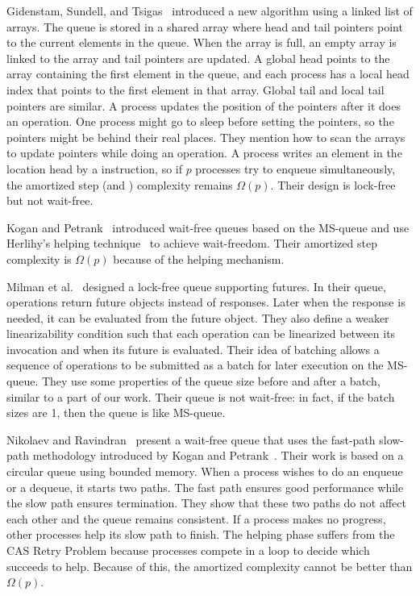 Gidenstam, Sundell, and Tsigas~\cite{DBLP:conf/opodis/GidenstamST10}
introduced a new algorithm using a linked list of arrays. The queue is
stored in a shared array where head and tail pointers point to the
current elements in the queue. When the array is full, an empty array
is linked to the array and tail pointers are updated. A global head
points to the array containing the first element in the queue, and
each process has a local head index that points to the first element
in that array. Global tail and local tail pointers are similar. A
process updates the position of the pointers after it does an
operation. One process might go to sleep before setting the pointers,
so the pointers might be behind their real places. They mention how to
scan the arrays to update pointers while doing an operation. A process
writes an element in the location head by a  instruction, so
if $p$ processes try to enqueue simultaneously, the amortized step
(and ) complexity remains $\Omega(p)$. Their design is
lock-free but not wait-free. 

Kogan and Petrank~\cite{DBLP:conf/ppopp/KoganP11} introduced wait-free
queues based on the MS-queue and use Herlihy's helping
technique~\cite{10.1145/114005.102808} to achieve wait-freedom. Their
amortized step complexity is $\Omega(p)$ because of the helping
mechanism. 

Milman et al.~\cite{DBLP:conf/spaa/MilmanKLLP18} designed a lock-free
queue supporting futures. In their queue, operations  return future
objects instead of responses. Later when the response is needed, it
can be evaluated from the future object. They also define a weaker
linearizability condition such that each operation can be linearized
between its invocation and when its future is evaluated. Their idea of
batching allows a sequence of operations to be submitted as a batch
for later execution on the MS-queue. They use some properties of the
queue size before and after a batch, similar to a part of our
work. Their queue is not wait-free: in fact, if the batch sizes are 1,
then the queue is like MS-queue. 

Nikolaev and Ravindran~\cite{10.1145/3490148.3538572} present a
wait-free queue that uses the fast-path slow-path methodology
introduced by Kogan and Petrank~\cite{10.1145/2370036.2145835}. Their
work is based on a circular queue using bounded memory. When a process
wishes to do an enqueue or a dequeue, it starts two paths. The fast
path  ensures good performance while the slow path ensures
termination. They show that these two paths do not affect each other
and the queue remains consistent. If a process makes no progress,
other processes help its slow path to finish. The helping phase
suffers from the CAS Retry Problem because processes compete in a
 loop to decide which succeeds to help. Because of this, the
amortized complexity cannot be better than $\Omega(p)$. 

